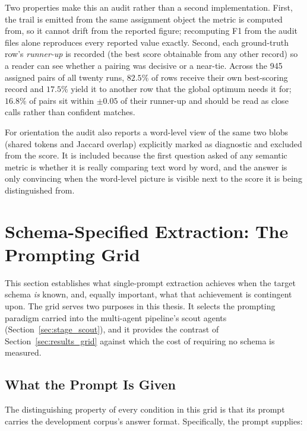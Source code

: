 \documentclass[11pt]{article}
\begin{document}
Two properties make this an audit rather than a second implementation. First, the
trail is emitted from the same assignment object the metric is computed from, so
it cannot drift from the reported figure; recomputing F1 from the audit files
alone reproduces every reported value exactly. Second, each ground-truth row's
\emph{runner-up} is recorded (the best score obtainable from any other record) so a reader can see whether a pairing was decisive or a near-tie. Across the
945 assigned pairs of all twenty runs, $82.5\%$ of rows receive their own
best-scoring record and $17.5\%$ yield it to another row that the global optimum
needs it for; $16.8\%$ of pairs sit within $\pm 0.05$ of their runner-up and should
be read as close calls rather than confident matches.

For orientation the audit also reports a word-level view of the same two blobs (shared tokens and Jaccard overlap) explicitly marked as diagnostic and
excluded from the score. It is included because the first question asked of any
semantic metric is whether it is really comparing text word by word, and the
answer is only convincing when the word-level picture is visible next to the
score it is being distinguished from.


\section{Schema-Specified Extraction: The Prompting Grid}
\label{sec:grid_search}

This section establishes what single-prompt extraction achieves when the target
schema \emph{is} known, and, equally important, what that achievement is
contingent upon. The grid serves two purposes in this thesis. It selects the
prompting paradigm carried into the multi-agent pipeline's scout agents
(Section~\ref{sec:stage_scout}), and it provides the contrast of
Section~\ref{sec:results_grid} against which the cost of requiring no schema is
measured.

\subsection{What the Prompt Is Given}
\label{sec:grid_prompt_contents}
The distinguishing property of every condition in this grid is that its prompt
carries the development corpus's answer format. Specifically, the prompt supplies:
\end{document}
